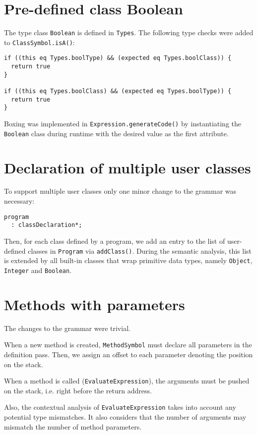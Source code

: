\documentclass{guide}
\begin{document}
	\section{Pre-defined class Boolean}
	The type class \texttt{Boolean} is defined in \texttt{Types}. The following
	type checks were added to \texttt{ClassSymbol.isA()}:

\begin{verbatim}
if ((this eq Types.boolType) && (expected eq Types.boolClass)) {
  return true
}

if ((this eq Types.boolClass) && (expected eq Types.boolType)) {
  return true
}
\end{verbatim}

    Boxing was implemented in \texttt{Expression.generateCode()} by
    instantiating the \texttt{Boolean} class during runtime with the desired
    value as the first attribute.

	\section{Declaration of multiple user classes}
	To support multiple user classes only one minor change to the grammar was
	necessary:

\begin{verbatim}
program
  : classDeclaration*;
\end{verbatim}

	Then, for each class defined by a program, we add an entry to the list of
	user-defined classes in \texttt{Program} via \texttt{addClass()}. During the
	semantic analysis, this list is extended by all built-in classes that wrap primitive
	data types, namely \texttt{Object}, \texttt{Integer} and
	\texttt{Boolean}.

	\section{Methods with parameters}
	The changes to the grammar were trivial.

	When a new method is created, \texttt{MethodSymbol} must declare all parameters in the
	definition pass. Then, we assign an offset to each parameter
	denoting the position on the stack.

	When a method is called (\texttt{EvaluateExpression}), the arguments must
	be pushed on the stack, i.e. right before the return address.

	Also, the contextual analysis of \texttt{EvaluateExpression} takes into account
	any potential type mismatches. It also considers that the number of arguments
	may mismatch the number of method parameters.
\end{document}

